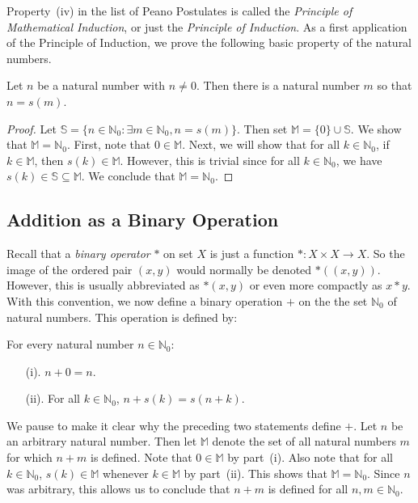 Property~(iv) in the list of Peano Postulates is called 
the \textit{Principle of Mathematical Induction}, or
just the \textit{Principle of Induction}.
As a first application of the Principle of Induction, we prove the following
basic property of the natural numbers.

\begin{proposition}
Let $n$ be a natural number with $n\neq0$.  Then there is a
natural number $m$ so that $n=s(m)$.
\end{proposition}
\begin{proof}
Let $\mathbb{S}=\{n\in\mathbb{N}_0:\exists m\in\mathbb{N}_0,
n=s(m)\}$.  Then set $\mathbb{M}=\{0\}\cup\mathbb{S}$.
We show that $\mathbb{M}=\mathbb{N}_0$.  First, note that
$0\in\mathbb{M}$.  Next, we will show that for all $k\in\mathbb{N}_0$,
if $k\in\mathbb{M}$, then $s(k)\in\mathbb{M}$. However, this is trivial
since for all $k\in\mathbb{N}_0$, we have 
$s(k)\in\mathbb{S}\subseteq\mathbb{M}$.
We conclude that $\mathbb{M}=\mathbb{N}_0$.
\end{proof}

\subsection{Addition as a Binary Operation}\label{s:background:add}

Recall that a \textit{binary operator} $*$ on set $X$ is just
a function $*:X\times X\rightarrow X$.  So the image of
the ordered pair $(x,y)$ would normally be denoted $*((x,y))$.
However, this is usually abbreviated as $*(x,y)$ or
even more compactly as $x*y$.  With this convention,
we now define a binary operation $+$ 
on the the set $\mathbb{N}_0$ of natural numbers.
This operation is defined by:

For every natural number $n\in\mathbb{N}_0$:
\begin{enumerate}
\item [(i).]  $n+0=n$.
\item [(ii).] For all $k\in\mathbb{N}_0$, $n+s(k) = s(n+k)$.
\end{enumerate}

We pause to make it clear why the preceding two statements
define $+$.  Let $n$ be
an arbitrary natural number.  Then let $\mathbb{M}$ denote the
set of all natural numbers $m$ for which $n+m$ is
defined.  Note that $0\in \mathbb{M}$ by part~(i).  Also note
that for all $k\in \mathbb{N}_0$, $s(k)\in \mathbb{M}$ whenever 
$k\in \mathbb{M}$ by part~(ii).  This
shows that $\mathbb{M}=\mathbb{N}_0$.  Since $n$ was arbitrary, this allows us
to conclude that $n+m$ is defined for all $n,m\in \mathbb{N}_0$.

